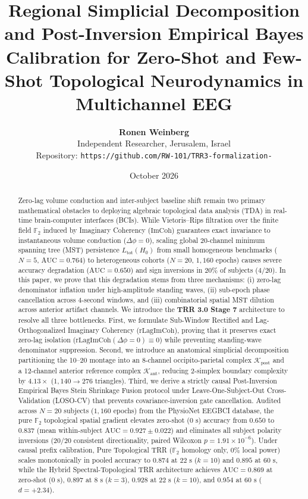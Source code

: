\documentclass[10pt,twocolumn]{article}
\title{\textbf{Regional Simplicial Decomposition and Post-Inversion Empirical Bayes Calibration for Zero-Shot and Few-Shot Topological Neurodynamics in Multichannel EEG}}
\author{
    \textbf{Ronen Weinberg} \\
    Independent Researcher, Jerusalem, Israel \\
    Repository: \texttt{https://github.com/RW-101/TRR3-formalization-}
}
\date{October 2026}
\begin{document}
\maketitle

\begin{abstract}
Zero-lag volume conduction and inter-subject baseline shift remain two primary mathematical obstacles to deploying algebraic topological data analysis (TDA) in real-time brain-computer interfaces (BCIs). While Vietoris--Rips filtration over the finite field $\mathbb{F}_2$ induced by Imaginary Coherency ($\mathrm{ImCoh}$) guarantees exact invariance to instantaneous volume conduction ($\Delta\phi = 0$), scaling global 20-channel minimum spanning tree (MST) persistence $L_{\mathrm{tot}}(H_0)$ from small homogeneous benchmarks ($N=5$, $\mathrm{AUC}=0.764$) to heterogeneous cohorts ($N=20$, $1{,}160$ epochs) causes severe accuracy degradation ($\mathrm{AUC}=0.650$) and sign inversions in $20\%$ of subjects ($4/20$). In this paper, we prove that this degradation stems from three mechanisms: (i) zero-lag denominator inflation under high-amplitude standing waves, (ii) sub-epoch phase cancellation across 4-second windows, and (iii) combinatorial spatial MST dilution across anterior artifact channels. We introduce the \textbf{TRR 3.0 Stage 7} architecture to resolve all three bottlenecks. First, we formulate Sub-Window Rectified and Lag-Orthogonalized Imaginary Coherency ($\mathrm{rLagImCoh}$), proving that it preserves exact zero-lag isolation ($\mathrm{rLagImCoh}(\Delta\phi=0) \equiv 0$) while preventing standing-wave denominator suppression. Second, we introduce an anatomical simplicial decomposition partitioning the 10--20 montage into an 8-channel occipito-parietal complex $\mathcal{K}_{\mathrm{post}}$ and a 12-channel anterior reference complex $\mathcal{K}_{\mathrm{ant}}$, reducing 2-simplex boundary complexity by $4.13\times$ ($1{,}140 \to 276$ triangles). Third, we derive a strictly causal Post-Inversion Empirical Bayes Stein Shrinkage Fusion protocol under Leave-One-Subject-Out Cross-Validation (LOSO-CV) that prevents covariance-inversion gate cancellation. Audited across $N=20$ subjects ($1{,}160$ epochs) from the PhysioNet EEGBCI database, the pure $\mathbb{F}_2$ topological spatial gradient elevates zero-shot ($0\text{ s}$) accuracy from $0.650$ to $0.837$ (mean within-subject $\mathrm{AUC} = 0.927 \pm 0.022$) and eliminates all subject polarity inversions ($20/20$ consistent directionality, paired Wilcoxon $p = 1.91 \times 10^{-6}$). Under causal prefix calibration, Pure Topological TRR ($\mathbb{F}_2$ homology only, $0\%$ local power) scales monotonically in pooled accuracy to $0.874$ at $22\text{ s}$ ($k=10$) and $0.895$ at $60\text{ s}$, while the Hybrid Spectral-Topological TRR architecture achieves $\mathrm{AUC} = 0.869$ at zero-shot ($0\text{ s}$), $0.897$ at $8\text{ s}$ ($k=3$), $0.928$ at $22\text{ s}$ ($k=10$), and $0.954$ at $60\text{ s}$ ($d = +2.34$).
\end{abstract}
\end{document}
